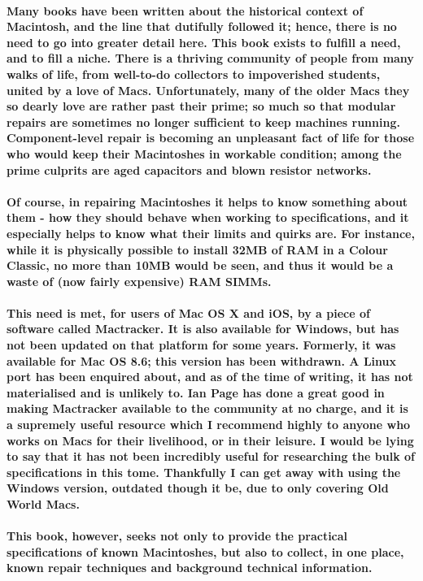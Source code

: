 \paragraph{%
Many books have been written about the historical context of Macintosh, and the line %
that dutifully followed it; hence, there is no need to go into greater detail here. %
This book exists to fulfill a need, and to fill a niche. There is a thriving community %
of people from many walks of life, from well-to-do collectors to impoverished students, %
united by a love of Macs. Unfortunately, many of the older Macs they so dearly love are %
rather past their prime; so much so that modular repairs are sometimes no longer sufficient %
to keep machines running. Component-level repair is becoming an unpleasant fact of life for %
those who would keep their Macintoshes in workable condition; among the prime culprits are %
aged capacitors and blown resistor networks. %
}

\paragraph{%
Of course, in repairing Macintoshes it helps to know something about them - how they should %
behave when working to specifications, and it especially helps to know what their limits and %
quirks are. For instance, while it is physically possible to install 32MB of RAM in a Colour %
Classic, no more than 10MB would be seen, and thus it would be a waste of (now fairly expensive) %
RAM SIMMs. %
}

\paragraph{%
This need is met, for users of Mac OS X and iOS, by a piece of software called Mactracker. It is also %
available for Windows, but has not been updated on that platform for some years. Formerly, it was %
available for Mac OS 8.6; this version has been withdrawn. A Linux port has been enquired about, %
and as of the time of writing, it has not materialised and is unlikely to. %
Ian Page has done a great good in making Mactracker available to the community at no %
charge, and it is a supremely useful resource which I recommend highly to anyone who works on Macs %
for their livelihood, or in their leisure. I would be lying to say that it has not been %
incredibly useful for researching the bulk of specifications in this tome. Thankfully %
I can get away with using the Windows version, outdated though it be, due to only covering %
Old World Macs. %
}

\paragraph{%
This book, however, seeks not only to provide the practical specifications of known Macintoshes, %
but also to collect, in one place, known repair techniques and background technical information. %
}
